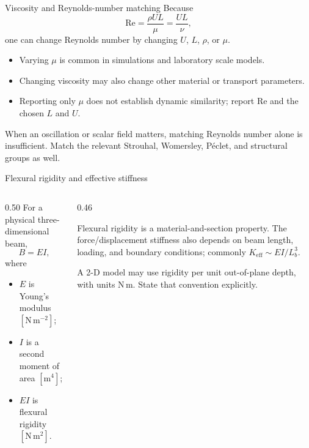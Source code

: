 \documentclass[aspectratio=169,11pt]{beamer}
\begin{document}
\begin{frame}{Viscosity and Reynolds-number matching}
Because
\[
  \mathrm{Re}=\frac{\rho UL}{\mu}=\frac{UL}{\nu},
\]
one can change Reynolds number by changing $U$, $L$, $\rho$, or $\mu$.
\begin{itemize}\itemsep6pt
  \item Varying $\mu$ is common in simulations and laboratory scale models.
  \item Changing viscosity may also change other material or transport parameters.
  \item Reporting only $\mu$ does not establish dynamic similarity; report $\mathrm{Re}$ and the chosen $L$ and $U$.
\end{itemize}
\begin{punchbox}
\small When an oscillation or scalar field matters, matching Reynolds number alone is insufficient. Match the relevant Strouhal, Womersley, Péclet, and structural groups as well.
\end{punchbox}
\end{frame}

\begin{frame}{Flexural rigidity and effective stiffness}
\begin{columns}[T,onlytextwidth]
\begin{column}{0.50\textwidth}
For a physical three-dimensional beam,
\[
  \boxed{B=EI},
\]
where
\begin{itemize}\itemsep4pt
  \item $E$ is Young's modulus $[\mathrm{N\,m^{-2}}]$;
  \item $I$ is a second moment of area $[\mathrm{m^4}]$;
  \item $EI$ is flexural rigidity $[\mathrm{N\,m^2}]$.
\end{itemize}
\end{column}
\begin{column}{0.46\textwidth}
\begin{punchbox}
\small
Flexural rigidity is a material-and-section property. The force/displacement stiffness also depends on beam length, loading, and boundary conditions; commonly $K_{\mathrm{eff}}\sim EI/L_b^3$.
\end{punchbox}
\medskip
A 2-D model may use rigidity per unit out-of-plane depth, with units $\mathrm{N\,m}$. State that convention explicitly.
\end{column}
\end{columns}
\end{frame}
\end{document}
